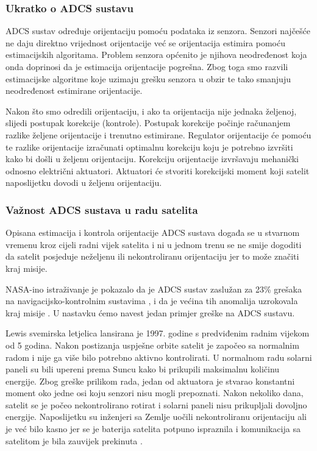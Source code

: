 \documentclass[times, utf8, diplomski, numeric]{templates/template}
\begin{document}
{{{{                \subsubsection{Ukratko o ADCS sustavu}{
                    ADCS sustav određuje orijentaciju pomoću podataka iz senzora. Senzori najčešće ne daju direktno vrijednost orijentacije već se orijentacija estimira pomoću estimacijskih algoritama. Problem senzora općenito je njihova neodređenost koja onda doprinosi da je estimacija orijentacije pogrešna. Zbog toga smo razvili estimacijske algoritme koje uzimaju grešku senzora u obzir te tako smanjuju neodređenost estimirane orijentacije.

                    Nakon što smo odredili orijentaciju, i ako ta orijentacija nije jednaka željenoj, slijedi postupak korekcije (kontrole). Postupak korekcije počinje računanjem razlike željene orijentacije i trenutno estimirane. Regulator orijentacije će pomoću te razlike orijentacije izračunati optimalnu korekciju koju je potrebno izvršiti kako bi došli u željenu orijentaciju. Korekciju orijentacije izvršavaju mehanički odnosno električni aktuatori. Aktuatori će stvoriti korekcijski moment koji satelit naposlijetku dovodi u željenu orijentaciju.
                }

                \subsubsection{Važnost ADCS sustava u radu satelita}{
                    Opisana estimacija i kontrola orijentacije ADCS sustava događa se u stvarnom vremenu kroz cijeli radni vijek satelita i ni u jednom trenu se ne smije dogoditi da satelit posjeduje neželjenu ili nekontroliranu orijentaciju jer to može značiti kraj misije.

                    NASA-ino istraživanje je pokazalo da je ADCS sustav zaslužan za 23\% grešaka na navigacijsko-kontrolnim sustavima , i da je većina tih anomalija uzrokovala kraj misije \cite{greskeNaAdcsPostotak}. U nastavku ćemo navest jedan primjer greške na ADCS sustavu.

                    Lewis svemirska letjelica \cite{lewis} lansirana je 1997. godine s predviđenim radnim vijekom od 5 godina. Nakon postizanja uspješne orbite satelit je započeo sa normalnim radom i nije ga više bilo potrebno aktivno kontrolirati. U normalnom radu solarni paneli su bili upereni prema Suncu kako bi prikupili maksimalnu količinu energije. Zbog greške prilikom rada, jedan od aktuatora je stvarao konstantni moment oko jedne osi koju senzori nisu mogli prepoznati. Nakon nekoliko dana, satelit se je počeo nekontrolirano rotirat i solarni paneli nisu prikupljali dovoljno energije. Naposlijetku su inženjeri sa Zemlje uočili nekontroliranu orijentaciju ali je već bilo kasno jer se je baterija satelita potpuno ispraznila i komunikacija sa satelitom je bila zauvijek prekinuta \cite{greskeNaAdcsSlucajevi}.
                }
            }
        }
    }
}
\end{document}
